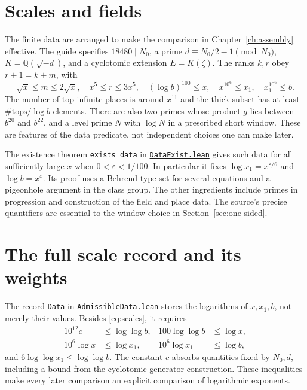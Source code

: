 \documentclass[11pt,oneside,openany]{amsbook}
\theoremstyle{remark}
\numberwithin{equation}{section}
\newcommand{\Q}{\mathbb Q}
\newcommand{\eps}{\varepsilon}
\newcommand{\ghroot}{https://github.com/lsernau/grh-lean/blob/}
\newcommand{\ghrev}{72fead102f663d5c7a407964a13dc0cf9d977207}
\newcommand{\leanfile}[2]{%
  \href{\ghroot\ghrev/grh-compact/src/#1}{\nolinkurl{#2}}}
\begin{document}
\section{Scales and fields}
The finite data are arranged to make the comparison in
Chapter~\ref{ch:assembly} effective. The guide specifies
$18480\mid N_0$, a prime $d\equiv N_0/2-1\pmod{N_0}$,
$K=\Q(\sqrt{-d})$, and a cyclotomic extension $E=K(\zeta)$.
The ranks $k,r$ obey $r+1=k+m$, with
\begin{equation}
\label{eq:scales}
\sqrt{x}\le m\le2\sqrt{x},\quad
x^5\le r\le3x^5,\quad
(\log b)^{100}\le x,\quad
x^{10^6}\le x_1,\quad x_1^{10^6}\le b.
\end{equation}
The number of top infinite places is around $x^{11}$ and the
thick subset has at least $\#\mathrm{tops}/\log b$ elements.
There are also two primes whose product $g$ lies between
$b^{20}$ and $b^{22}$, and a level prime $N$ with
$\log N$ in a prescribed short window. These are features of
the data predicate, not independent choices one can make later.

The existence theorem \texttt{exists\_data} in
\leanfile{New/Data/DataExist.lean}{DataExist.lean} gives such
data for all sufficiently large $x$ when $0<\eps<1/100$.
In particular it fixes $\log x_1=x^{\eps/6}$ and
$\log b=x^\eps$. Its proof uses a Behrend-type set for
several equations and a pigeonhole argument in the class group.
The other ingredients include primes in progression and
construction of the field and place data. The source's precise
quantifiers are essential to the window choice in
Section~\ref{sec:one-sided}.

\section{The full scale record and its weights}
\label{sec:data-record}
The record \texttt{Data} in
\leanfile{New/Data/AdmissibleData.lean}{AdmissibleData.lean}
stores the logarithms of $x,x_1,b$, not merely their
values. Besides \eqref{eq:scales}, it requires
\begin{align}
\label{eq:log-scale-record}
10^{12}c&\le\log\log b,
&100\log\log b&\le\log x,\\
10^6\log x&\le\log x_1,
&10^6\log x_1&\le\log b,
\end{align}
and $6\log\log x_1\le\log\log b$. The constant $c$
absorbs quantities fixed by $N_0,d$, including a bound
from the cyclotomic generator construction. These
inequalities make every later comparison an explicit
comparison of logarithmic exponents.
\end{document}
